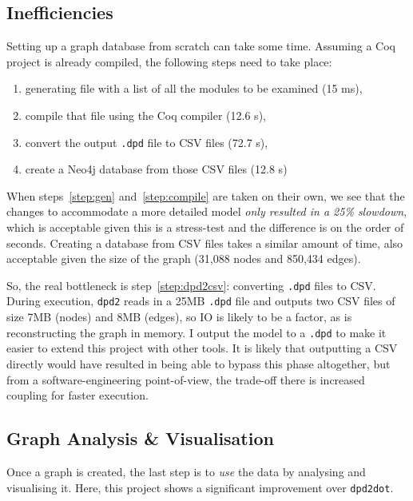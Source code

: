 \subsection{Inefficiencies}\label{subsec:ineff}

Setting up a graph database from scratch can take some time. Assuming a Coq
project is already compiled, the following steps need to take place:

\begin{enumerate}
  \item\label{step:gen} generating file with a list of all the modules to be
    examined (15 ms),
  \item\label{step:compile} compile that file using the Coq compiler (12.6 s),
  \item\label{step:dpd2csv} convert the output \texttt{.dpd} file to CSV files (72.7 s),
  \item create a Neo4j database from those CSV files (12.8 s)
\end{enumerate}

When steps~\ref{step:gen} and~\ref{step:compile} are taken on their own, we see
that the changes to accommodate a more detailed model \emph{only resulted in a
25\% slowdown}, which is acceptable given this is a stress-test and the
difference is on the order of seconds. Creating a database from CSV files takes
a similar amount of time, also acceptable given the size of the graph (31,088
nodes and 850,434 edges).

So, the real bottleneck is step~\ref{step:dpd2csv}: converting \texttt{.dpd}
files to CSV. During execution, \texttt{dpd2} reads in a 25MB \texttt{.dpd} file
and outputs two CSV files of size 7MB (nodes) and 8MB (edges), so IO is likely
to be a factor, as is reconstructing the graph in memory. I output the model to
a \texttt{.dpd} to make it easier to extend this project with other tools. It is
likely that outputting a CSV directly would have resulted in being able to
bypass this phase altogether, but from a software-engineering point-of-view, the
trade-off there is increased coupling for faster execution.

\subsection{Graph Analysis \& Visualisation}

Once a graph is created, the last step is to \emph{use} the data by analysing
and visualising it. Here, this project shows a significant improvement over
\texttt{dpd2dot}.

